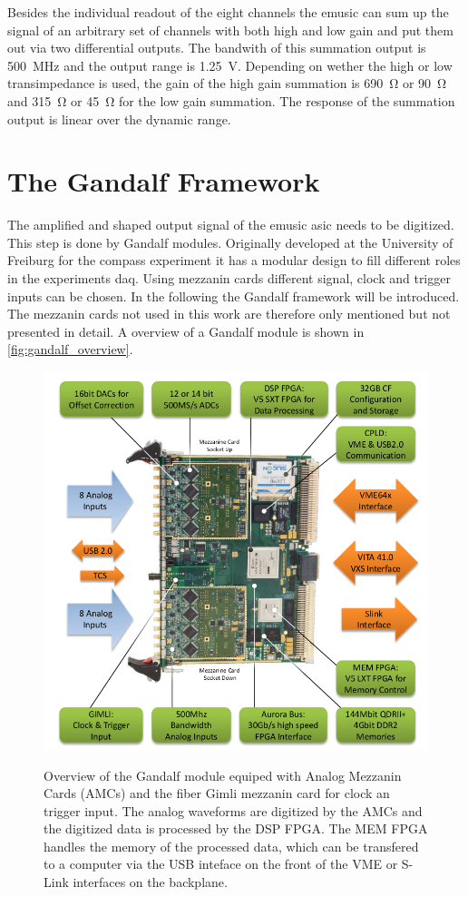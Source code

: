 Besides the individual readout of the eight channels the \ac{emusic} can sum up the signal of an arbitrary set of channels with both high and low gain and put them out via two differential outputs.
The bandwith of this summation output is \SI{500}{\mega\hertz} and the output range is \SI{1.25}{\volt}.
Depending on wether the high or low transimpedance is used, the gain of the high gain summation is \SI{690}{\ohm} or \SI{90}{\ohm} and \SI{315}{\ohm} or \SI{45}{\ohm} for the low gain summation. 
The response of the summation output is linear over the dynamic range.

\section{The Gandalf Framework}
The amplified and shaped output signal of the \ac{emusic} \ac{asic} needs to be digitized.
This step is done by Gandalf modules.
Originally developed at the University of Freiburg for the \ac{compass} experiment it has a modular design to fill different roles in the experiments \ac{daq}.
Using mezzanin cards different signal, clock and trigger inputs can be chosen.
In the following the Gandalf framework will be introduced.
The mezzanin cards not used in this work are therefore only mentioned but not presented in detail.
A overview of a Gandalf module is shown in \autoref{fig:gandalf_overview}.
\begin{figure}
	\centering
	\includegraphics[width=1.\linewidth]{pictures/gandalf_overview.png}
	\label{fig:gandalf_overview}
	\caption{Overview of the Gandalf module equiped with Analog Mezzanin Cards (AMCs) and the fiber Gimli mezzanin card for clock an trigger input. The analog waveforms are digitized by the AMCs and the digitized data is processed by the DSP FPGA. The MEM FPGA handles the memory of the processed data, which can be transfered to a computer via the USB inteface on the front of the VME or S-Link interfaces on the backplane. \cite{herrmann}}
\end{figure}

